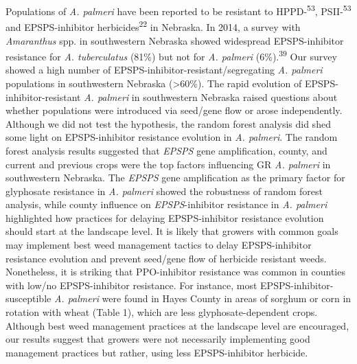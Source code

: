 \documentclass[
  12pt,
  a4paper]{article}
\begin{document}
Populations of \emph{A. palmeri} have been reported to be resistant to
HPPD-\textsuperscript{53}, PSII-\textsuperscript{53} and EPSPS-inhibitor
herbicides\textsuperscript{22} in Nebraska. In 2014, a survey with
\emph{Amaranthus} spp. in southwestern Nebraska showed widespread
EPSPS-inhibitor resistance for \emph{A. tuberculatus} (81\%) but not for
\emph{A. palmeri} (6\%).\textsuperscript{39} Our survey showed a high
number of EPSPS-inhibitor-resistant/segregating \emph{A. palmeri}
populations in southwestern Nebraska (\textgreater60\%). The rapid
evolution of EPSPS-inhibitor-resistant \emph{A. palmeri} in southwestern
Nebraska raised questions about whether populations were introduced via
seed/gene flow or arose independently. Although we did not test the
hypothesis, the random forest analysis did shed some light on
EPSPS-inhibitor resistance evolution in \emph{A. palmeri}. The random
forest analysis results suggested that \emph{EPSPS} gene amplification,
county, and current and previous crops were the top factors influencing
GR \emph{A. palmeri} in southwestern Nebraska. The \emph{EPSPS} gene
amplification as the primary factor for glyphosate resistance in
\emph{A. palmeri} showed the robustness of random forest analysis, while
county influence on \emph{EPSPS}-inhibitor resistance in \emph{A.
palmeri} highlighted how practices for delaying EPSPS-inhibitor
resistance evolution should start at the landscape level. It is likely
that growers with common goals may implement best weed management
tactics to delay EPSPS-inhibitor resistance evolution and prevent
seed/gene flow of herbicide resistant weeds. Nonetheless, it is striking
that PPO-inhibitor resistance was common in counties with low/no
EPSPS-inhibitor resistance. For instance, most
EPSPS-inhibitor-susceptible \emph{A. palmeri} were found in Hayes County
in areas of sorghum or corn in rotation with wheat (Table 1), which are
less glyphosate-dependent crops. Although best weed management practices
at the landscape level are encouraged, our results suggest that growers
were not necessarily implementing good management practices but rather,
using less EPSPS-inhibitor herbicide.
\end{document}
